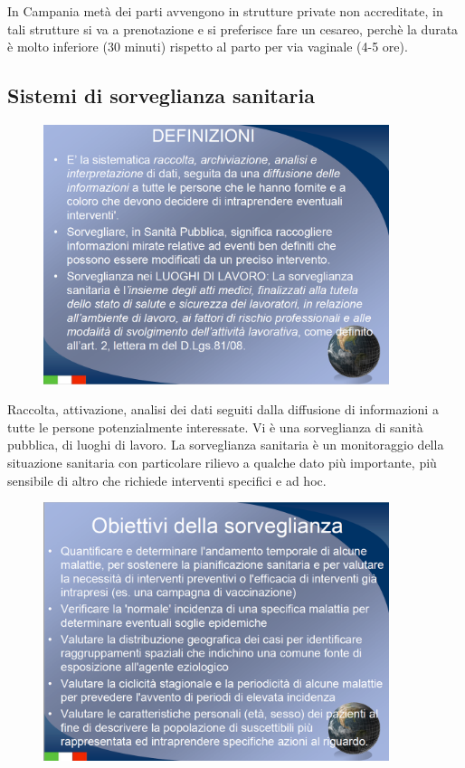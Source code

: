 In Campania metà dei parti avvengono in strutture private non
accreditate, in tali strutture si va a prenotazione e si preferisce fare
un cesareo, perchè la durata è molto inferiore (30 minuti) rispetto al
parto per via vaginale (4-5 ore).

\subsection{Sistemi di sorveglianza sanitaria }

\begin{figure}[!ht]
\centering
	\includegraphics[width=0.9\textwidth]{02/image8.png}
\end{figure}


Raccolta, attivazione, analisi dei dati seguiti dalla diffusione di
informazioni a tutte le persone potenzialmente interessate. Vi è una
sorveglianza di sanità pubblica, di luoghi di lavoro. La sorveglianza
sanitaria è un monitoraggio della situazione sanitaria con particolare
rilievo a qualche dato più importante, più sensibile di altro che
richiede interventi specifici e ad hoc.
\begin{figure}[!ht]
\centering
	\includegraphics[width=0.9\textwidth]{02/image9.png}
\end{figure}



